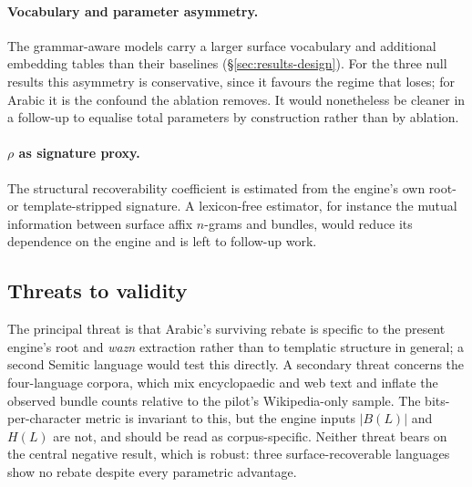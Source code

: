 \paragraph{Vocabulary and parameter asymmetry.} The grammar-aware models carry a larger surface vocabulary and additional embedding tables than their baselines (\S\ref{sec:results-design}). For the three null results this asymmetry is conservative, since it favours the regime that loses; for Arabic it is the confound the ablation removes. It would nonetheless be cleaner in a follow-up to equalise total parameters by construction rather than by ablation.

\paragraph{$\rho$ as signature proxy.} The structural recoverability coefficient is estimated from the engine's own root- or template-stripped signature. A lexicon-free estimator, for instance the mutual information between surface affix $n$-grams and bundles, would reduce its dependence on the engine and is left to follow-up work.

\subsection{Threats to validity}
\label{sec:discussion-threats}

The principal threat is that Arabic's surviving rebate is specific to the present engine's root and \emph{wazn} extraction rather than to templatic structure in general; a second Semitic language would test this directly. A secondary threat concerns the four-language corpora, which mix encyclopaedic and web text and inflate the observed bundle counts relative to the pilot's Wikipedia-only sample. The bits-per-character metric is invariant to this, but the engine inputs $|B(L)|$ and $H(L)$ are not, and should be read as corpus-specific. Neither threat bears on the central negative result, which is robust: three surface-recoverable languages show no rebate despite every parametric advantage.
